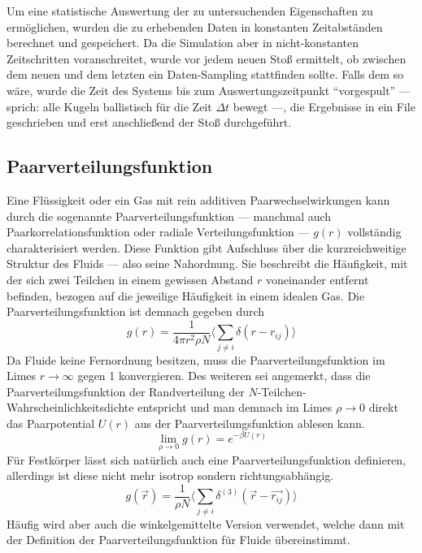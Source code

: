 Um eine statistische Auswertung der zu untersuchenden Eigenschaften zu ermöglichen, wurden die zu erhebenden Daten in konstanten Zeitabständen berechnet und gespeichert. Da die Simulation aber in nicht-konstanten Zeitschritten voranschreitet, wurde vor jedem neuen Stoß ermittelt, ob zwischen dem neuen und dem letzten ein Daten-Sampling stattfinden sollte. Falls dem so wäre, wurde die Zeit des Systems bis zum Auswertungszeitpunkt ``vorgespult'' --- sprich: alle Kugeln ballistisch für die Zeit $\Delta t$ bewegt ---, die Ergebnisse in ein File geschrieben und erst anschließend der Stoß durchgeführt.   
\subsection{Paarverteilungsfunktion}\label{sec:paarverteilung}
Eine Flüssigkeit oder ein Gas mit rein additiven Paarwechselwirkungen kann durch die sogenannte Paarverteilungsfunktion --- manchmal auch Paarkorrelationsfunktion oder radiale Verteilungsfunktion --- $g(r)$ vollständig charakterisiert werden. Diese Funktion gibt Aufschluss über die kurzreichweitige Struktur des Fluids --- also seine Nahordnung. Sie beschreibt die Häufigkeit, mit der sich zwei Teilchen in einem gewissen Abstand $r$ voneinander entfernt befinden, bezogen auf die jeweilige Häufigkeit in einem idealen Gas. Die Paarverteilungsfunktion ist demnach gegeben durch
\begin{equation}
g(r) = \frac{1}{4\pi r^2 \rho N} \langle \sum_{j\neq i} \delta(r-r_{ij}) \rangle
\end{equation}   
Da Fluide keine Fernordnung besitzen, muss die Paarverteilungsfunktion im Limes $r \rightarrow \infty$ gegen 1 konvergieren. Des weiteren sei angemerkt, dass die Paarverteilungsfunktion der Randverteilung der $N$-Teilchen-Wahrscheinlichkeitsdichte entspricht und man demnach im Limes $\rho \rightarrow 0$ direkt das Paarpotential $U(r)$ aus der Paarverteilungsfunktion ablesen kann.  
\begin{equation}
\lim_{\rho \rightarrow 0} g(r) = e^{-\beta U(r)}
\end{equation}
Für Festkörper lässt sich natürlich auch eine Paarverteilungsfunktion definieren, allerdings ist diese nicht mehr isotrop sondern richtungsabhängig. 
\begin{equation}
g(\vec{r}) = \frac{1}{\rho N} \langle \sum_{j\neq i} \delta^{(3)}(\vec{r}-\vec{r_{ij}}) \rangle
\end{equation} 
Häufig wird aber auch die winkelgemittelte Version verwendet, welche dann mit der Definition der Paarverteilungsfunktion für Fluide übereinstimmt. 

